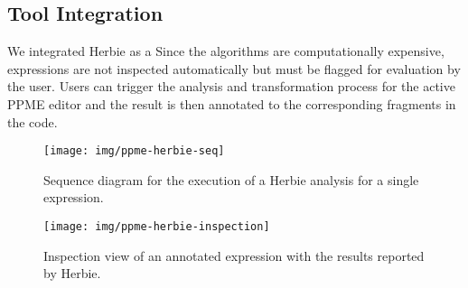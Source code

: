 \subsection{Tool Integration}
We integrated Herbie as a 
%
Since the algorithms  are computationally expensive, expressions are not 
inspected automatically but must be flagged for evaluation by the user. Users can 
trigger the analysis and transformation process for the active PPME editor and the 
result is then annotated to the corresponding fragments in the code.

\begin{figure}
\begin{minipage}{.42\textwidth}
  \texttt{[image: img/ppme-herbie-seq]}%
  \caption{Sequence diagram for the execution of a Herbie analysis for a single expression.}%
  \label{fig:ppme-herbie-seq}%
\end{minipage}
\hfill%
\begin{minipage}{.55\textwidth}
  \texttt{[image: img/ppme-herbie-inspection]}%
   \caption{Inspection view of an annotated expression with the results reported by Herbie.}%
   \label{fig:ppme-herbie-intention}%
\end{minipage}
\end{figure}

